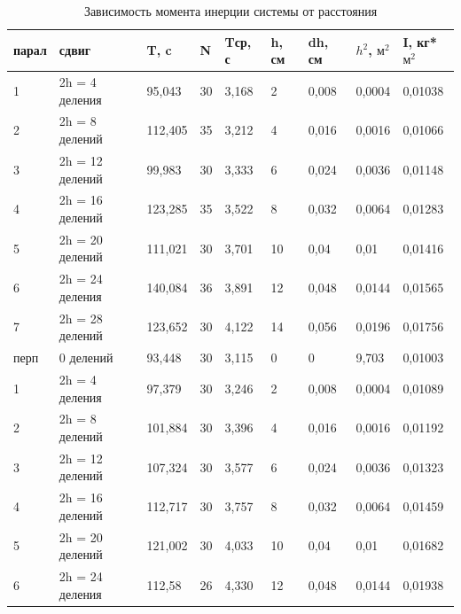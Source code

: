 \documentclass[a4paper,14pt]{extarticle}
\begin{document}
\begin{table}[!ht]
	\centering
	\vspace{-3em}
	\begin{tabular}{|l|l|l|l|l|l|l|l|l|}
		\hline
		парал & сдвиг & T, c & N & Tср, с & h, см & dh, см & $h^2$, $\text{м}^2$ & I, кг*$\text{м}^2$ \\ \hline
		1 & 2h = 4 деления & 95,043 & 30 & 3,168 & 2 & 0,008 & 0,0004 & 0,01038 \\ \hline
		2 & 2h = 8 делений & 112,405 & 35 & 3,212 & 4 & 0,016 & 0,0016 & 0,01066 \\ \hline
		3 & 2h = 12 делений & 99,983 & 30 & 3,333 & 6 & 0,024 & 0,0036 & 0,01148 \\ \hline
		4 & 2h = 16 делений & 123,285 & 35 & 3,522 & 8 & 0,032 & 0,0064 & 0,01283 \\ \hline
		5 & 2h = 20 делений & 111,021 & 30 & 3,701 & 10 & 0,04 & 0,01 & 0,01416 \\ \hline
		6 & 2h = 24 деления & 140,084 & 36 & 3,891 & 12 & 0,048 & 0,0144 & 0,01565 \\ \hline
		7 & 2h = 28 делений & 123,652 & 30 & 4,122 & 14 & 0,056 & 0,0196 & 0,01756 \\ \hline
		перп & 0 делений & 93,448 & 30 & 3,115 & 0 & 0 & 9,703 & 0,01003 \\ \hline
		1 & 2h = 4 деления & 97,379 & 30 & 3,246 & 2 & 0,008 & 0,0004 & 0,01089 \\ \hline
		2 & 2h = 8 делений & 101,884 & 30 & 3,396 & 4 & 0,016 & 0,0016 & 0,01192 \\ \hline
		3 & 2h = 12 делений & 107,324 & 30 & 3,577 & 6 & 0,024 & 0,0036 & 0,01323 \\ \hline
		4 & 2h = 16 делений & 112,717 & 30 & 3,757 & 8 & 0,032 & 0,0064 & 0,01459 \\ \hline
		5 & 2h = 20 делений & 121,002 & 30 & 4,033 & 10 & 0,04 & 0,01 & 0,01682 \\ \hline
		6 & 2h = 24 деления & 112,58 & 26 & 4,330 & 12 & 0,048 & 0,0144 & 0,01938 \\ \hline
	\end{tabular}
	\caption{Зависимость момента инерции системы от расстояния}
	\label{tab:moment}
\end{table}
	
\end{document}
